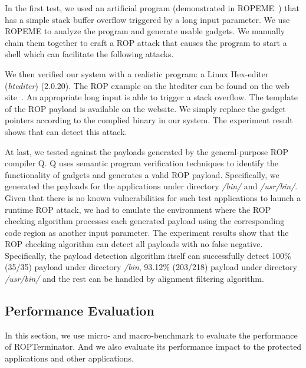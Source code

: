 In the first test, we used an artificial program (demonstrated in ROPEME~\cite{ropeme}) that has a simple stack buffer overflow triggered by a long input parameter. We use ROPEME to analyze the program and generate usable gadgets. We manually chain them together to craft a ROP attack that causes the program to start a shell which can facilitate the following attacks.

We then verified our system with a realistic program: a Linux Hex-editer (\emph{htediter}) (2.0.20). The ROP example on the htediter can be found on the web site~\cite{htediter}. An appropriate long input is able to trigger a stack overflow. The template of the ROP payload is available on the website. We simply replace the gadget pointers according to the complied binary in our system. The experiment result shows that \name can detect this attack.

At last, we tested \name against the payloads generated by the general-purpose ROP compiler Q. Q uses semantic program verification techniques to identify the functionality of gadgets and generates a valid ROP payload. Specifically, we generated the payloads for the applications under directory \emph{/bin/} and \emph{/usr/bin/}. Given that there is no known vulnerabilities for such test applications to launch a runtime ROP attack, we had to emulate the environment where the ROP checking algorithm processes each generated payload using the corresponding code region as another input parameter. The experiment results show that the ROP checking algorithm can detect all payloads with no false negative.
Specifically, the payload detection algorithm itself can successfully detect 100\% (35/35) payload under directory \emph{/bin}, 93.12\% (203/218) payload under directory \emph{/usr/bin/} and the rest can be handled by alignment filtering algorithm.

\subsection{Performance Evaluation}\label{sec:per}
In this section, we use micro- and macro-benchmark to evaluate the performance of ROPTerminator. And we also evaluate its performance impact to the protected applications and other applications.

